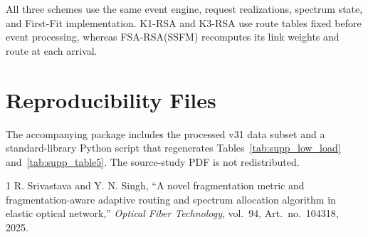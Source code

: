 \documentclass[letterpaper,journal]{IEEEtran}
\begin{document}
All three schemes use the same event engine, request realizations, spectrum
state, and First-Fit implementation. K1-RSA and K3-RSA use route tables fixed
before event processing, whereas FSA-RSA(SSFM) recomputes its link weights and
route at each arrival.

\section{Reproducibility Files}

The accompanying package includes the processed v31 data subset and a
standard-library Python script that regenerates Tables~\ref{tab:supp_low_load}
and~\ref{tab:supp_table5}. The source-study PDF is not redistributed.

\begin{thebibliography}{1}
R. Srivastava and Y. N. Singh, ``A novel fragmentation metric and
fragmentation-aware adaptive routing and spectrum allocation algorithm in
elastic optical network,'' \emph{Optical Fiber Technology}, vol.~94,
Art.~no.~104318, 2025.
\end{thebibliography}
\end{document}
